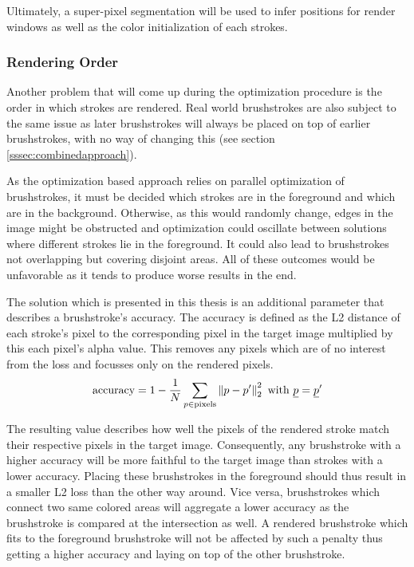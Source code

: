 Ultimately, a super-pixel segmentation will be used to infer positions for render windows as well as the color initialization of each strokes.

\subsubsection{Rendering Order}
Another problem that will come up during the optimization procedure is the order in which strokes are rendered.
Real world brushstrokes are also subject to the same issue as later brushstrokes will always be placed on top of earlier brushstrokes, with no way of changing this (see section \ref{sssec:combinedapproach}).

As the optimization based approach relies on parallel optimization of brushstrokes, it must be decided which strokes are in the foreground and which are in the background.
Otherwise, as this would randomly change, edges in the image might be obstructed and optimization could oscillate between solutions where different strokes lie in the foreground.
It could also lead to brushstrokes not overlapping but covering disjoint areas.
All of these outcomes would be unfavorable as it tends to produce worse results in the end.

The solution which is presented in this thesis is an additional parameter that describes a brushstroke's accuracy.
The accuracy is defined as the L2 distance of each stroke's pixel to the corresponding pixel in the target image multiplied by this each pixel's alpha value.
This removes any pixels which are of no interest from the loss and focusses only on the rendered pixels.
\begin{align}
    \text{accuracy} = 1 - \frac{1}{N} \sum_{p \in \text{pixels}} \left\lVert p - p'\right\rVert_2^2 \text{ with } \underline p = \underline p' 
\end{align}

The resulting value describes how well the pixels of the rendered stroke match their respective pixels in the target image.
Consequently, any brushstroke with a higher accuracy will be more faithful to the target image than strokes with a lower accuracy.
Placing these brushstrokes in the foreground should thus result in a smaller L2 loss than the other way around.
Vice versa, brushstrokes which connect two same colored areas will aggregate a lower accuracy as the brushstroke is compared at the intersection as well.
A rendered brushstroke which fits to the foreground brushstroke will not be affected by such a penalty thus getting a higher accuracy and laying on top of the other brushstroke.


